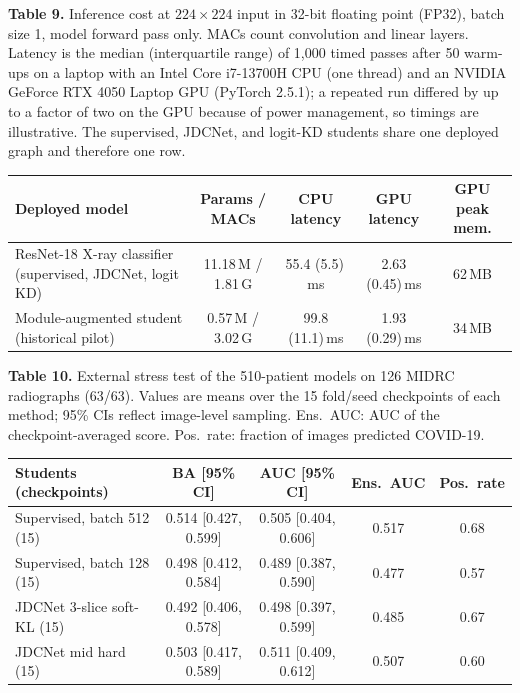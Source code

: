 \documentclass[pdflatex,sn-vancouver,Numbered]{sn-jnl}
\begin{document}
\begin{minipage}{\textwidth}
{\small\noindent\textbf{Table 9.} Inference cost at $224{\times}224$ input in 32-bit floating point (FP32), batch size 1, model forward pass only. MACs count convolution and linear layers. Latency is the median (interquartile range) of 1{,}000 timed passes after 50 warm-ups on a laptop with an Intel Core i7-13700H CPU (one thread) and an NVIDIA GeForce RTX 4050 Laptop GPU (PyTorch 2.5.1); a repeated run differed by up to a factor of two on the GPU because of power management, so timings are illustrative. The supervised, JDCNet, and logit-KD students share one deployed graph and therefore one row.\par}
\vspace{6pt}


\centering
\scriptsize
\setlength{\tabcolsep}{2.4pt}
\renewcommand{\arraystretch}{0.9}
\begin{tabularx}{\columnwidth}{@{}>{\raggedright\arraybackslash}Xcccc@{}}
\toprule
Deployed model & Params / MACs & CPU latency & GPU latency & GPU peak mem. \\
\midrule
ResNet-18 X-ray classifier (supervised, JDCNet, logit KD) & 11.18\,M / 1.81\,G & 55.4 (5.5)\,ms & 2.63 (0.45)\,ms & 62\,MB \\
Module-augmented student (historical pilot) & 0.57\,M / 3.02\,G & 99.8 (11.1)\,ms & 1.93 (0.29)\,ms & 34\,MB \\
\bottomrule
\end{tabularx}
\end{minipage}
\clearpage

\begin{minipage}{\textwidth}
{\small\noindent\textbf{Table 10.} External stress test of the 510-patient models on 126 MIDRC radiographs (63/63). Values are means over the 15 fold/seed checkpoints of each method; 95\% CIs reflect image-level sampling. Ens.\ AUC: AUC of the checkpoint-averaged score. Pos.\ rate: fraction of images predicted COVID-19.\par}
\vspace{6pt}


\centering
\scriptsize
\setlength{\tabcolsep}{2.4pt}
\renewcommand{\arraystretch}{0.92}
\begin{tabularx}{\columnwidth}{@{}>{\raggedright\arraybackslash}Xcccc@{}}
\toprule
Students (checkpoints) & BA [95\% CI] & AUC [95\% CI] & Ens.\ AUC & Pos.\ rate \\
\midrule
Supervised, batch 512 (15) & 0.514 [0.427, 0.599] & 0.505 [0.404, 0.606] & 0.517 & 0.68 \\
Supervised, batch 128 (15) & 0.498 [0.412, 0.584] & 0.489 [0.387, 0.590] & 0.477 & 0.57 \\
JDCNet 3-slice soft-KL (15) & 0.492 [0.406, 0.578] & 0.498 [0.397, 0.599] & 0.485 & 0.67 \\
JDCNet mid hard (15) & 0.503 [0.417, 0.589] & 0.511 [0.409, 0.612] & 0.507 & 0.60 \\
\bottomrule
\end{tabularx}
\end{minipage}
\clearpage
\end{document}
